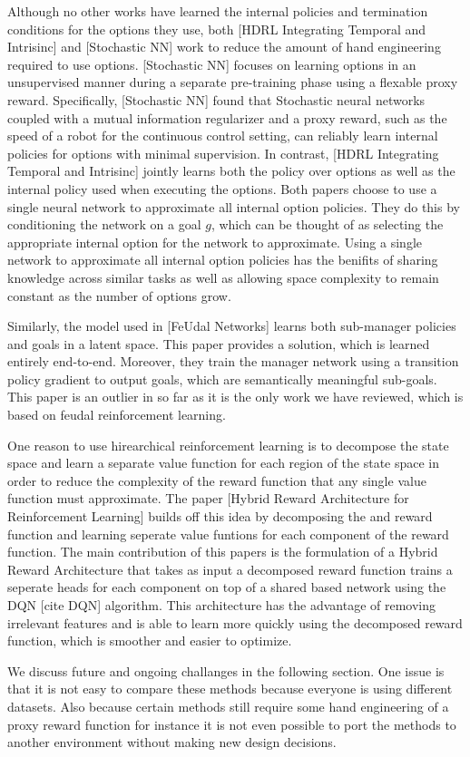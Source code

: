 Although no other works have learned the internal policies and termination conditions
for the options they use, both [HDRL Integrating Temporal and Intrisinc] and
[Stochastic NN] work to reduce the amount of hand engineering required
to use options. [Stochastic NN] focuses on learning options in an unsupervised manner
during a separate pre-training phase using a flexable proxy reward.
Specifically, [Stochastic NN] found that Stochastic neural networks coupled with
a mutual information regularizer and a proxy reward, such as the speed of a
robot for the continuous control setting, can reliably learn internal policies for
options with minimal supervision. In contrast,
[HDRL Integrating Temporal and Intrisinc] jointly learns both the policy over options
as well as the internal policy used when executing the options. Both papers choose to
use a single neural network to approximate all internal option policies. They do this
by conditioning the network on a goal $g$, which can be thought of as selecting the
appropriate internal option for the network to approximate. Using a single network
to approximate all internal option policies has the benifits of sharing knowledge
across similar tasks as well as allowing space complexity to remain constant as
the number of options grow.

Similarly, the model used in [FeUdal Networks] learns both sub-manager policies and
goals in a latent space. This paper provides a solution, which is learned entirely
end-to-end. Moreover, they train the manager network using a transition
policy gradient to output goals, which are semantically meaningful sub-goals.
This paper is an outlier in so far as it is the only work we have
reviewed, which is based on feudal reinforcement learning.

One reason to use hirearchical reinforcement learning is
to decompose the state space and learn a separate value function
for each region of the state space in order to reduce the complexity of the reward
function that any single value function must approximate. The paper
[Hybrid Reward Architecture for Reinforcement Learning] builds off this idea
by decomposing the and reward function and learning seperate value funtions for
each component of the reward function. The main contribution of this papers is
the formulation of a Hybrid Reward Architecture that takes as input a decomposed
reward function trains a seperate heads for each component on top of a shared based
network using the DQN [cite DQN] algorithm. This architecture has the advantage of
removing irrelevant features and is able to learn more quickly using the decomposed
reward function, which is smoother and easier to optimize.




We discuss future and ongoing challanges in the following section.
One issue is that it is not easy to compare these methods because
everyone is using different datasets. Also because certain methods
still require some hand engineering of a proxy reward function for instance
it is not even possible to port the methods to another environment without
making new design decisions.
